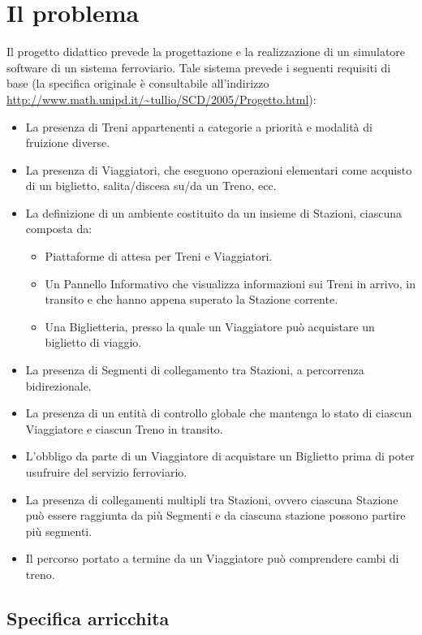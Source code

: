 \chapter{Il problema}

Il progetto didattico prevede la progettazione e la realizzazione di un simulatore software di un sistema ferroviario. Tale sistema prevede i seguenti requisiti di base (la specifica originale è consultabile all'indirizzo \url{http://www.math.unipd.it/~tullio/SCD/2005/Progetto.html}):
	\begin{itemize}
		\item La presenza di Treni appartenenti a categorie a priorità e modalità di fruizione diverse. 
		\item La presenza di Viaggiatori, che eseguono operazioni elementari come acquisto di un biglietto, salita/discesa su/da un Treno, ecc.
		\item La definizione di un ambiente costituito da un insieme di Stazioni, ciascuna composta da:
			\begin{itemize}
				\item Piattaforme di attesa per Treni e Viaggiatori.
				\item Un Pannello Informativo che visualizza informazioni sui Treni in arrivo, in transito e che hanno appena superato la Stazione corrente.
				\item Una Biglietteria, presso la quale un Viaggiatore può acquistare un biglietto di viaggio.
			\end{itemize}
		\item La presenza di Segmenti di collegamento tra Stazioni, a percorrenza bidirezionale.
		\item La presenza di un entità di controllo globale che mantenga lo stato di ciascun Viaggiatore e ciascun Treno in transito.
		\item L'obbligo da parte di un Viaggiatore di acquistare un Biglietto prima di poter usufruire del servizio ferroviario.
		\item La presenza di collegamenti multipli tra Stazioni, ovvero ciascuna Stazione può essere raggiunta da più Segmenti e da ciascuna stazione possono partire più segmenti.
		\item Il percorso portato a termine da un Viaggiatore può comprendere cambi di treno.
	\end{itemize}

\section{Specifica arricchita}


